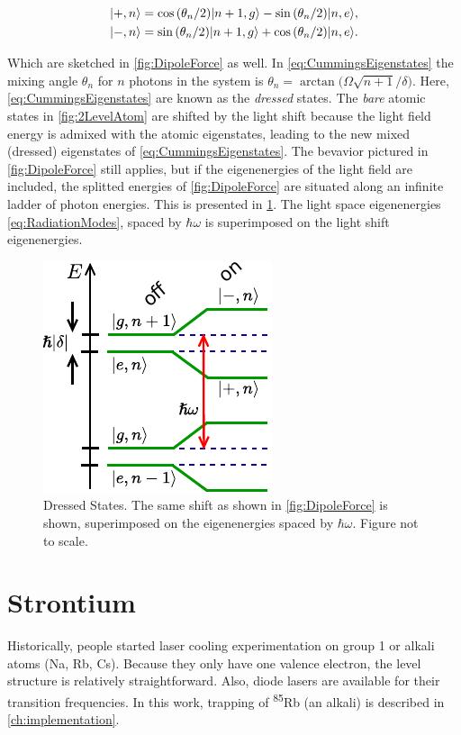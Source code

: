 \begin{subequations}\label{eq:CummingsEigenstates}
    \begin{align}
        \lvert+,n\rangle &= \cos{({\theta_n}/2)} \lvert n+1,g\rangle -\sin{(\theta_n/2)} \lvert n,e\rangle, \\
        \lvert-,n\rangle &= \sin{(\theta_n/2)}\lvert n+1,g\rangle + \cos{(\theta_n/2)} \lvert n,e\rangle.
    \end{align}
\end{subequations}

Which are sketched in \cref{fig:DipoleForce} as well. 
In \cref{eq:CummingsEigenstates} the mixing angle $\theta_n$ for $n$ photons in the system is $\theta_n = \arctan{(\Omega\sqrt{n+1} / \delta})$.
Here, \cref{eq:CummingsEigenstates} are known as the \emph{dressed} states.
The \emph{bare} atomic states in \cref{fig:2LevelAtom} are shifted by the light shift because the light field energy is admixed with the atomic eigenstates, leading to the new mixed (dressed) eigenstates of \cref{eq:CummingsEigenstates}. 
The bevavior pictured in \cref{fig:DipoleForce} still applies, but if the eigenenergies of the light field are included, the splitted energies of \cref{fig:DipoleForce} are situated along an infinite ladder of photon energies. 
This is presented in \cref{fig:DressedStatePicture}. 
The light space eigenenergies \cref{eq:RadiationModes}, spaced by $\hbar \omega$ is superimposed on the light shift eigenenergies. 

\begin{figure}
    \centering
    \includegraphics[width=0.3\linewidth]{figures/DressedStates.pdf}
    \caption{Dressed States. The same shift as shown in \cref{fig:DipoleForce} is shown, superimposed on the  eigenenergies spaced by $\hbar \omega$. 
    Figure not to scale. }
    \label{fig:DressedStatePicture}
\end{figure}


\section{Strontium}\label{sec:Sr}

Historically, people started laser cooling experimentation on group 1 or alkali atoms (Na, Rb, Cs).
Because they only have one valence electron, the level structure is relatively straightforward.
Also, diode lasers are available for their transition frequencies. 
In this work, trapping of \textsuperscript{85}Rb (an alkali) is described in \cref{ch:implementation}.

